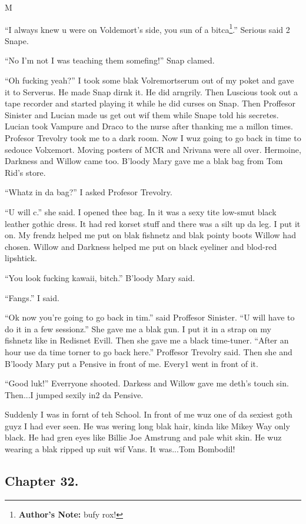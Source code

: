 M\documentclass{article}
\begin{document}
\textbreak
\linenumbers\resetlinenumber

“I always knew u were on Voldemort’s side, you sun of a bitca\footnote{\textbf{Author's Note: }bufy rox!}.” Serious said 2 Snape.

“No I’m not I was teaching them somefing!” Snap clamed.

“Oh fucking yeah?” I took some blak Volremortserum out of my poket and gave it to Serverus. He made Snap dirnk it. He did arngrily. Then Luscious took out a tape recorder and started playing it while he did curses on Snap. Then Proffesor Sinister and Lucian made us get out wif them while Snape told his secretes. Lucian took Vampure and Draco to the nurse after thanking me a millon times. Profesor Trevolry took me to a dark room. Now I wuz going to go back in time to sedouce Volxemort. Moving posters of MCR and Nrivana were all over. Hermoine, Darkness and Willow came too. B’loody Mary gave me a blak bag from Tom Rid’s store.

“Whatz in da bag?” I asked Profesor Trevolry.

“U will c.” she said. I opened thee bag. In it was a sexy tite low-smut black leather gothic dress. It had red korset stuff and there was a silt up da leg. I put it on. My frendz helped me put on blak fishnetz and blak pointy boots Willow had chosen. Willow and Darkness helped me put on black eyeliner and blod-red lipshtick.

“You look fucking kawaii, bitch.” B’loody Mary said.

“Fangs.” I said.

“Ok now you’re going to go back in tim.” said Proffesor Sinister. “U will have to do it in a few sessionz.” She gave me a blak gun. I put it in a strap on my fishnetz like in Redisnet Evill. Then she gave me a black time-tuner. “After an hour use da time torner to go back here.” Proffesor Trevolry said. Then she and B’loody Mary put a Pensive in front of me. Every1 went in front of it.

“Good luk!” Everryone shooted. Darkess and Willow gave me deth’s touch sin. Then...I jumped sexily in2 da Pensive.

Suddenly I was in fornt of teh School. In front of me wuz one of da sexiest goth guyz I had ever seen. He was wering long blak hair, kinda like Mikey Way only black. He had gren eyes like Billie Joe Amstrung and pale whit skin. He wuz wearing a blak ripped up suit wif Vans. It was...Tom Bombodil!

\clearpage\nolinenumbers
\subsection*{Chapter 32.}
\end{document}
